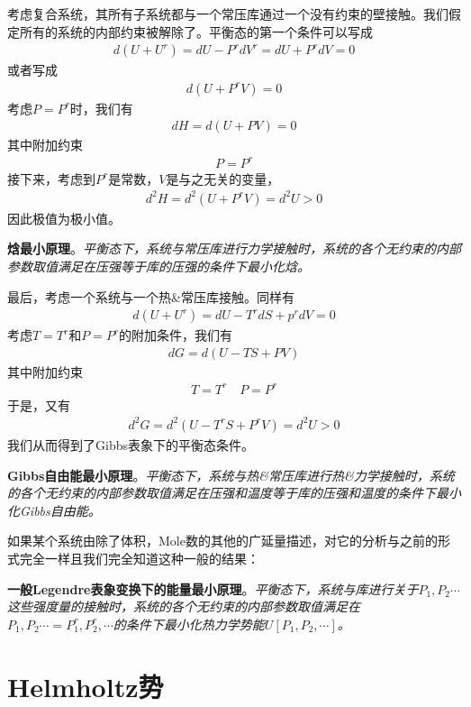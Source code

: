考虑复合系统，其所有子系统都与一个常压库通过一个没有约束的壁接触。我们假定所有的系统的内部约束被解除了。平衡态的第一个条件可以写成
\begin{align}\label{equ6.14}
d(U+U^r)=dU-P^rdV^r=dU+P^rdV=0
\end{align}
或者写成
\begin{align}\label{equ6.15}
d(U+P^rV)=0
\end{align}
考虑$P=P^r$时，我们有
\begin{align}\label{equ6.16}
dH=d(U+PV)=0
\end{align}
其中附加约束
\begin{align}\label{equ6.17}
P=P^r
\end{align}
接下来，考虑到$P^r$是常数，$V$是与之无关的变量，
\begin{align}\label{equ6.18}
d^2H=d^2(U+P^rV)=d^2U>0
\end{align}
因此极值为极小值。

{\bf 焓最小原理}。{\it 平衡态下，系统与常压库进行力学接触时，系统的各个无约束的内部参数取值满足在压强等于库的压强的条件下最小化焓。}

最后，考虑一个系统与一个热\&常压库接触。同样有
\begin{align}\label{equ6.19}
d(U+U^r)=dU-T^rdS+p^rdV=0
\end{align}
考虑$T=T^r$和$P=P^r$的附加条件，我们有
\begin{align}\label{equ6.20}
dG=d(U-TS+PV)
\end{align}
其中附加约束
\begin{align}\label{equ6.21}
T=T^r\quad P=P^r
\end{align}
于是，又有
\begin{align}\label{equ6.22}
d^2G=d^2(U-T^rS+P^rV)=d^2U>0
\end{align}
我们从而得到了Gibbs表象下的平衡态条件。

{\bf Gibbs自由能最小原理}。{\it 平衡态下，系统与热\&常压库进行热\&力学接触时，系统的各个无约束的内部参数取值满足在压强和温度等于库的压强和温度的条件下最小化Gibbs自由能。}

如果某个系统由除了体积，Mole数的其他的广延量描述，对它的分析与之前的形式完全一样且我们完全知道这种一般的结果：

{\bf 一般Legendre表象变换下的能量最小原理}。{\it 平衡态下，系统与库进行关于$P_1, P_2\cdots$这些强度量的接触时，系统的各个无约束的内部参数取值满足在$P_1, P_2\cdots=P_1^r, P_2^r, \cdots$的条件下最小化热力学势能$U[P_1, P_2, \cdots]$。}


\section{Helmholtz势}
\label{sec6.2}

